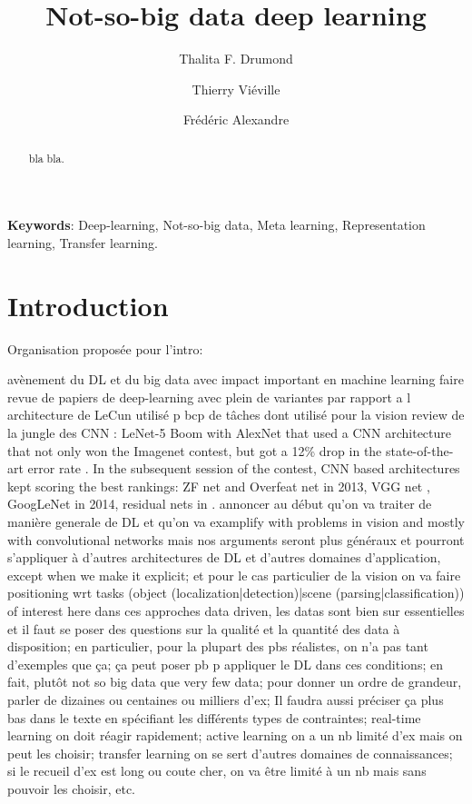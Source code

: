 \documentclass[twocolumn]{article}
\title{Not-so-big data deep learning}
\author[1]{Thalita F. Drumond}
\author[1]{Thierry Vi\'eville}
\author[1]{Fr\'ed\'eric Alexandre}
\affil[1]{Mnemosyne team, INRIA Bordeaux}
\begin{document}
\maketitle

\begin{abstract}
  bla bla.
\end{abstract}
\medskip

\noindent\textbf{Keywords}: Deep-learning, Not-so-big data, Meta learning, Representation learning, Transfer learning.

\section*{Introduction}

Organisation proposée pour l'intro:
\begin{outline}[enumerate]
\1 avènement du DL et du big data avec impact important en machine learning
\1  faire revue de papiers de deep-learning avec plein de variantes par rapport a l architecture de LeCun utilisé p bcp de tâches dont utilisé pour la vision
\2 review de la jungle des CNN : \cite{Srinivas2016Taxonomy}
\2 LeNet-5 \cite{Lecun1998Gradient}
\2 Boom with AlexNet  that used a CNN architecture that not only won the Imagenet contest, but got a 12\% drop in the state-of-the-art error rate \cite{Krizhevsky2012Imagenet}. In the subsequent session of the contest, CNN based architectures kept scoring the best rankings: ZF net \cite{Zeiler2014Visualizing} and Overfeat net in 2013\cite{Sermanet2013Overfeat}, VGG net \cite{Simonyan2015Very},  GoogLeNet \cite{Szegedy2014Going} in 2014, residual nets in \cite{He2016Deep}.
\1  annoncer au début qu'on va traiter de manière generale de DL et qu'on va examplify with problems in vision and mostly with convolutional networks mais nos arguments seront plus généraux et pourront s'appliquer à d'autres architectures de DL et d'autres domaines d'application, except when we make it explicit; et pour le cas particulier de la vision on va faire positioning wrt tasks
(object (localization|detection)|scene (parsing|classification)) of interest here
\1 dans ces approches data driven, les datas sont bien sur essentielles et il faut se poser des questions sur la qualité et la quantité des data à disposition; en particulier, pour la plupart des pbs réalistes, on n'a pas tant d'exemples que ça; ça peut poser pb p appliquer le DL dans ces conditions; en fait, plutôt not so big data que very few data; pour donner un ordre de grandeur, parler de dizaines ou centaines ou milliers d'ex; Il faudra aussi préciser ça plus bas dans le texte en spécifiant les différents types de contraintes; real-time learning on doit réagir rapidement; active learning on a un nb limité d'ex mais on peut les choisir; transfer learning on se sert d'autres domaines de connaissances; si le recueil d'ex est long ou coute cher, on va être limité à un nb mais sans pouvoir les choisir, etc.

\end{outline}
\end{document}
